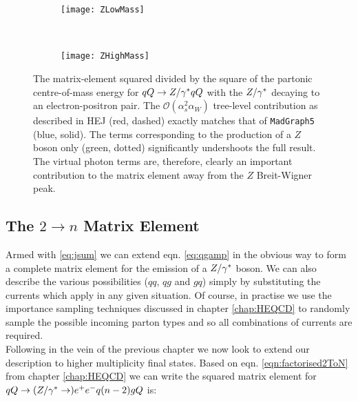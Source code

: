 		\begin{figure}[hbtp]
		        \centering
		        \begin{subfigure}[b]{0.82\textwidth}
		                \texttt{[image: ZLowMass]}
		                \caption{}
		                \label{fig:LowDileptonMass}
		        \end{subfigure}
		        ~
		        \begin{subfigure}[b]{0.82\textwidth}
		                \texttt{[image: ZHighMass]}
		                \caption{}
		                \label{fig:HighDileptonMass}
		        \end{subfigure}
		        \caption{The matrix-element squared divided by the square of the
		          partonic centre-of-mass energy for $qQ\to Z/\gamma^* qQ$ with the $Z/\gamma^*$ decaying
		          to an electron-positron pair.  The
		          $\mathcal{O}(\alpha_s^2 \alpha_W)$ tree-level contribution
		          as described in HEJ (red, dashed) exactly matches that of
		          \texttt{MadGraph5} (blue, solid).  The terms corresponding to the production
		          of a $Z$ boson only (green, dotted) significantly undershoots the
		          full result.  The
		          virtual photon terms are, therefore, clearly an important
		          contribution to the matrix element away from the $Z$ Breit-Wigner
		          peak.}
		        \label{fig:DileptonMass}
		\end{figure}

	\subsection{The $2\rightarrow n$ Matrix Element}

		Armed with \eqref{eq:jsum} we can extend eqn. \eqref{eq:qgamp} in the obvious way
		to form a complete matrix element for the emission of a $Z/\gamma^*$ boson.  We can also
		describe the various possibilities ($qq$, $qg$ and $gq$) simply by substituting
		the currents which apply in any given situation.  Of course, in practise we use
		the importance sampling techniques discussed in chapter \ref{chap:HEQCD} to
		randomly sample the possible incoming parton types and so all combinations of
		currents are required.\\Following in the vein of the previous chapter we now look
		to extend our description to higher multiplicity final states.  Based on eqn.
		\eqref{eqn:factorised2ToN} from chapter \ref{chap:HEQCD} we can write the squared
		matrix element for $qQ\to (Z/\gamma^*\to ) e^+e^- q (n-2)g Q$ is:

